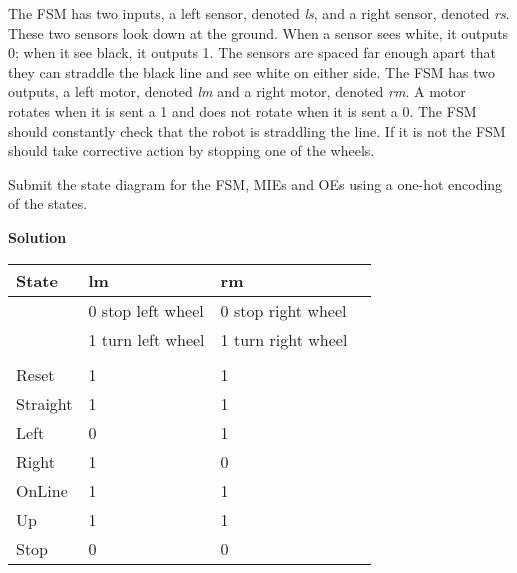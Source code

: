 \begin{enumerate}
        The FSM has two inputs, a left sensor, denoted \textit{ ls}, and a right
        sensor, denoted \textit{ rs}.  These two sensors look down at the ground.
        When a sensor sees white, it outputs 0; when it see black, it outputs 1.
        The sensors are spaced far enough apart that they can straddle the black
        line and see white on either side.  The FSM has two outputs, a left
        motor, denoted \textit{ lm} and a right motor, denoted \textit{ rm}.  A motor
        rotates when it is sent a 1 and does not rotate when it is sent a 0.
        The FSM should constantly check that the robot is straddling the line.
        If it is not the FSM should take corrective action by stopping one of
        the wheels.

        Submit the state diagram for the FSM,  MIEs and OEs using
        a one-hot encoding of the states.

        \begin{onlysolution}  \textbf{Solution} \itshape{
                \begin{figure}[ht]
                \end{figure}

                \begin{tabular}{l|l|l|l}
                    State & lm          & rm            \\ \hline
                    & 0 stop left wheel & 0 stop right wheel  \\ \hline
                    & 1 turn left wheel & 1 turn right wheel  \\ \hline
                    &                   &                     \\ \hline \hline
                    Reset     & 1          & 1            \\ \hline
                    Straight & 1          & 1            \\ \hline
                    Left     & 0          & 1            \\ \hline
                    Right    & 1          & 0            \\ \hline
                    OnLine   & 1          & 1            \\ \hline
                    Up     & 1          & 1            \\ \hline
                    Stop     & 0          & 0            \\
                \end{tabular}
            }
        \end{onlysolution}


\end{enumerate}
